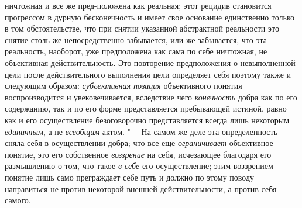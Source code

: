 {{ничтожная и все же пред-положена как реальная; этот рецидив становится
прогрессом в дурную бесконечность и имеет свое основание единственно только
в том обстоятельстве, что при снятии указанной абстрактной реальности это
снятие столь же непосредственно забывается, или же забывается, что эта
реальность, наоборот, уже предположена как сама по себе ничтожная, не
объективная действительность. Это повторение предположения о невыполненной
цели после действительного выполнения цели определяет себя поэтому также и
следующим образом: {\em субъективная
позиция} объективного понятия воспроизводится и
увековечивается, вследствие чего
{\em конечность} добра
как по его содержанию, так и по его форме представляется
пребывающей истиной, равно как и его осуществление безоговорочно
представляется всегда лишь некоторым
{\em единичным}, а не
{\em всеобщим} актом. "---
На самом же деле эта определенность сняла себя в
осуществлении добра; что все еще
{\em ограничивает}
объективное понятие, это его собственное
{\em воззрение} на себя,
исчезающее благодаря его размышлению о том, что такое
{\em в себе} его
осуществление; этим воззрением понятие лишь само преграждает себе путь и
должно по этому поводу направиться не против некоторой внешней
действительности, а против себя самого.

}}
